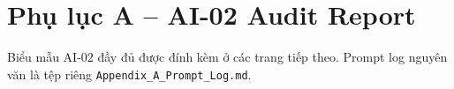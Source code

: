 \documentclass[12pt,a4paper]{article}
\begin{document}

\tableofcontents
\clearpage
{}


\appendix
\section*{Phụ lục A -- AI-02 Audit Report}
Biểu mẫu AI-02 đầy đủ được đính kèm ở các trang tiếp theo. Prompt log nguyên văn là tệp riêng \texttt{Appendix\_A\_Prompt\_Log.md}.
\clearpage

\end{document}
